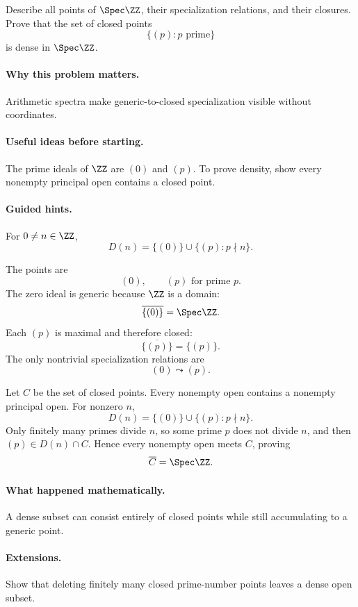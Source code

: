 \begin{problem}
Describe all points of $\Spec\ZZ$, their specialization relations, and their closures.
Prove that the set of closed points
\[
\{(p):p\text{ prime}\}
\]
is dense in $\Spec\ZZ$.
\end{problem}

\paragraph{Why this problem matters.}
Arithmetic spectra make generic-to-closed specialization visible without coordinates.

\paragraph{Useful ideas before starting.}
The prime ideals of $\ZZ$ are $(0)$ and $(p)$.  To prove density, show every nonempty
principal open contains a closed point.

\paragraph{Guided hints.}
For $0\neq n\in\ZZ$,
\[
D(n)=\{(0)\}\cup\{(p):p\nmid n\}.
\]

\begin{solution}
The points are
\[
(0),\qquad (p)\text{ for prime }p.
\]
The zero ideal is generic because $\ZZ$ is a domain:
\[
\overline{\{(0)\}}=\Spec\ZZ.
\]
Each $(p)$ is maximal and therefore closed:
\[
\overline{\{(p)\}}=\{(p)\}.
\]
The only nontrivial specialization relations are
\[
(0)\leadsto(p).
\]

Let $C$ be the set of closed points.  Every nonempty open contains a nonempty principal
open.  For nonzero $n$,
\[
D(n)=\{(0)\}\cup\{(p):p\nmid n\}.
\]
Only finitely many primes divide $n$, so some prime $p$ does not divide $n$, and then
$(p)\in D(n)\cap C$.  Hence every nonempty open meets $C$, proving
\[
\overline C=\Spec\ZZ.
\]
\end{solution}

\paragraph{What happened mathematically.}
A dense subset can consist entirely of closed points while still accumulating to a generic
point.

\paragraph{Extensions.}
Show that deleting finitely many closed prime-number points leaves a dense open subset.
